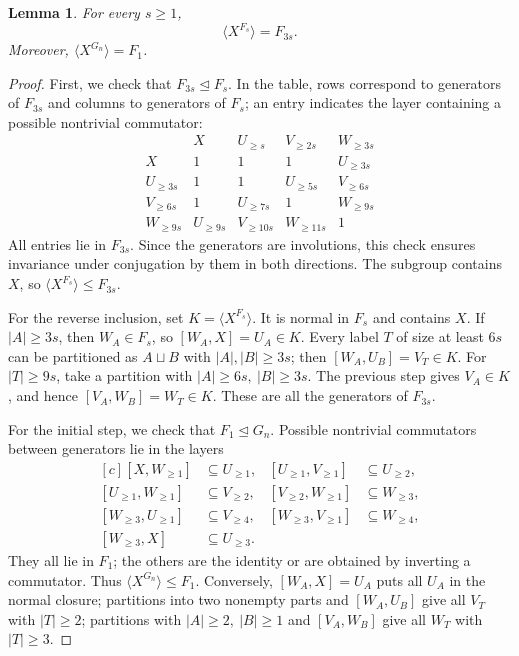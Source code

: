 \documentclass[11pt,a4paper]{article}
\newtheorem{lemma}[theorem]{Lemma}
\theoremstyle{definition}
\theoremstyle{remark}
\begin{document}
\begin{lemma}\label{lem:filtration}
For every \(s\ge1\),
\[
 \langle X^{F_s}\rangle=F_{3s}.
\]
Moreover, \(\langle X^{G_n}\rangle=F_1\).
\end{lemma}
\begin{proof}
First, we check that \(F_{3s}\trianglelefteq F_s\).
In the table, rows correspond to generators of \(F_{3s}\)
and columns to generators of \(F_s\); an entry indicates the layer
containing a possible nontrivial commutator:
\[
 \begin{array}{c|cccc}
 &X&U_{\ge s}&V_{\ge2s}&W_{\ge3s}\\ \hline
 X&1&1&1&U_{\ge3s}\\
 U_{\ge3s}&1&1&U_{\ge5s}&V_{\ge6s}\\
 V_{\ge6s}&1&U_{\ge7s}&1&W_{\ge9s}\\
 W_{\ge9s}&U_{\ge9s}&V_{\ge10s}&W_{\ge11s}&1
 \end{array}
\]
All entries lie in \(F_{3s}\).
Since the generators are involutions, this check ensures
invariance under conjugation by them in both directions.
The subgroup contains \(X\), so
\(\langle X^{F_s}\rangle\le F_{3s}\).

For the reverse inclusion, set \(K=\langle X^{F_s}\rangle\).
It is normal in \(F_s\) and contains \(X\).
If \(|A|\ge3s\), then \(W_A\in F_s\), so
\([W_A,X]=U_A\in K\).
Every label \(T\) of size at least \(6s\) can be partitioned
as \(A\sqcup B\) with \(|A|,|B|\ge3s\);
then \([W_A,U_B]=V_T\in K\).
For \(|T|\ge9s\), take a partition with
\(|A|\ge6s,\ |B|\ge3s\).
The previous step gives \(V_A\in K\), and hence
\([V_A,W_B]=W_T\in K\).
These are all the generators of \(F_{3s}\).

For the initial step, we check that \(F_1\trianglelefteq G_n\).
Possible nontrivial commutators between generators lie in the layers
\[
 \begin{aligned}[c]
 [X,W_{\ge1}]&\subseteq U_{\ge1},&
 [U_{\ge1},V_{\ge1}]&\subseteq U_{\ge2},\\
 [U_{\ge1},W_{\ge1}]&\subseteq V_{\ge2},&
 [V_{\ge2},W_{\ge1}]&\subseteq W_{\ge3},\\
 [W_{\ge3},U_{\ge1}]&\subseteq V_{\ge4},&
 [W_{\ge3},V_{\ge1}]&\subseteq W_{\ge4},\\
 [W_{\ge3},X]&\subseteq U_{\ge3}.
 \end{aligned}
\]
They all lie in \(F_1\); the others are the identity
or are obtained by inverting a commutator.
Thus \(\langle X^{G_n}\rangle\le F_1\).
Conversely, \([W_A,X]=U_A\) puts all \(U_A\) in the normal closure;
partitions into two nonempty parts and \([W_A,U_B]\)
give all \(V_T\) with \(|T|\ge2\);
partitions with \(|A|\ge2,\ |B|\ge1\) and \([V_A,W_B]\)
give all \(W_T\) with \(|T|\ge3\).
\end{proof}
\end{document}

